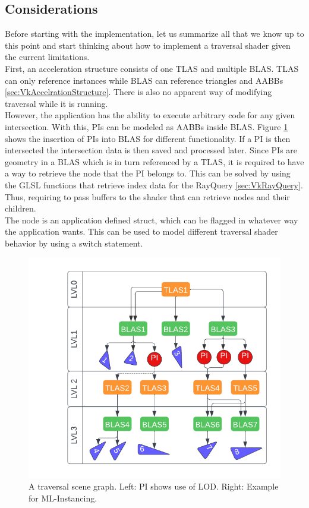 \subsection{Considerations}
\label{sec:Considerations}
Before starting with the implementation, let us summarize all that we know up to this point and start thinking about how to implement a traversal shader given the current limitations.\\
First, an acceleration structure consists of one TLAS and multiple BLAS. TLAS can only reference instances while BLAS can reference triangles and AABBs \ref{sec:VkAccelrationStructure}. There is also no apparent way of modifying traversal while it is running.\\
However, the application has the ability to execute arbitrary code for any given intersection. With this, PIs can be modeled as AABBs inside BLAS. Figure \ref{fig:TraversalHierarchy} shows the insertion of PIs into BLAS for different functionality. If a PI is then intersected the intersection data is then saved and processed later. Since PIs are geometry in a BLAS which is in turn referenced by a TLAS, it is required to have a way to retrieve the node that the PI belongs to. This can be solved by using the GLSL functions that retrieve index data for the RayQuery \ref{sec:VkRayQuery}. Thus, requiring to pass buffers to the shader that can retrieve nodes and their children.\\
The node is an application defined struct, which can be flagged in whatever way the application wants. This can be used to model different traversal shader behavior by using a switch statement.\\
\begin{figure}[hbp]
    \centering
    \includegraphics[width=.7\textwidth]{images/showcase/TraversalHierarchy.pdf}
    \caption{A traversal scene graph. Left: PI shows use of LOD. Right: Example for ML-Instancing.}
    \label{fig:TraversalHierarchy}
\end{figure}
